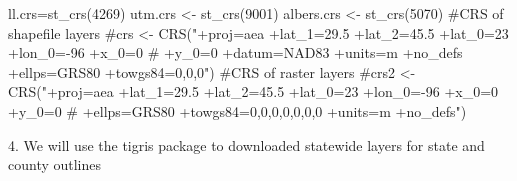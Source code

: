 \documentclass[
  letterpaper,
]{book}
\newenvironment{Shaded}{\begin{snugshade}}{\end{snugshade}}
\newcommand{\AttributeTok}[1]{\textcolor[rgb]{0.40,0.45,0.13}{#1}}
\newcommand{\CommentTok}[1]{\textcolor[rgb]{0.37,0.37,0.37}{#1}}
\newcommand{\ConstantTok}[1]{\textcolor[rgb]{0.56,0.35,0.01}{#1}}
\newcommand{\DecValTok}[1]{\textcolor[rgb]{0.68,0.00,0.00}{#1}}
\newcommand{\FunctionTok}[1]{\textcolor[rgb]{0.28,0.35,0.67}{#1}}
\newcommand{\NormalTok}[1]{\textcolor[rgb]{0.00,0.23,0.31}{#1}}
\newcommand{\OtherTok}[1]{\textcolor[rgb]{0.00,0.23,0.31}{#1}}
\newcommand{\SpecialCharTok}[1]{\textcolor[rgb]{0.37,0.37,0.37}{#1}}
\newcommand{\StringTok}[1]{\textcolor[rgb]{0.13,0.47,0.30}{#1}}
\begin{document}
\begin{Shaded}
\begin{Highlighting}[]
\NormalTok{ll.crs}\OtherTok{=}\FunctionTok{st\_crs}\NormalTok{(}\DecValTok{4269}\NormalTok{)}
\NormalTok{utm.crs }\OtherTok{\textless{}{-}} \FunctionTok{st\_crs}\NormalTok{(}\DecValTok{9001}\NormalTok{)}
\NormalTok{albers.crs }\OtherTok{\textless{}{-}} \FunctionTok{st\_crs}\NormalTok{(}\DecValTok{5070}\NormalTok{)}
\CommentTok{\#CRS of shapefile layers}
\CommentTok{\#crs \textless{}{-} CRS("+proj=aea +lat\_1=29.5 +lat\_2=45.5 +lat\_0=23 +lon\_0={-}96 +x\_0=0 }
\CommentTok{\#  +y\_0=0 +datum=NAD83 +units=m +no\_defs +ellps=GRS80 +towgs84=0,0,0")}
\CommentTok{\#CRS of raster layers}
\CommentTok{\#crs2 \textless{}{-} CRS("+proj=aea +lat\_1=29.5 +lat\_2=45.5 +lat\_0=23 +lon\_0={-}96 +x\_0=0 +y\_0=0 }
\CommentTok{\#  +ellps=GRS80 +towgs84=0,0,0,0,0,0,0 +units=m +no\_defs")}
\end{Highlighting}
\end{Shaded}

4. We will use the tigris package to downloaded statewide layers for
state and county outlines

\begin{Shaded}
\end{Shaded}
\end{document}
